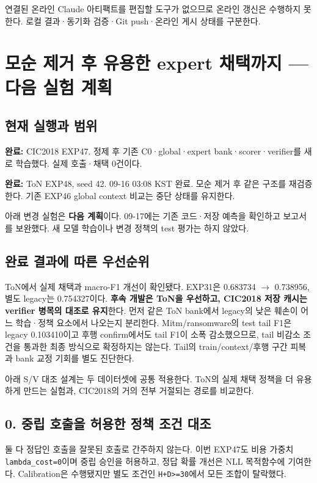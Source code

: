 연결된 온라인 Claude 아티팩트를 편집할 도구가 없으므로 온라인 갱신은 수행하지 못한다. 로컬 결과·동기화 검증·Git push·온라인 게시 상태를 구분한다.



\section{모순 제거 후 유용한 expert 채택까지 — 다음 실험 계획}
\subsection{현재 실행과 범위}
\par\noindent \textbullet\enspace \textbf{완료:} CIC2018 EXP47. 정제 후 기존 C0·global·expert bank·scorer·verifier를 새로 학습했다. 실제 호출·채택 0건이다.


\par\noindent \textbullet\enspace \textbf{완료:} ToN EXP48, seed 42. 09-16 03:08 KST 완료. 모순 제거 후 같은 구조를 재검증한다. 기존 EXP46 global context 비교는 중단 상태를 유지한다.


\par\noindent \textbullet\enspace 아래 변경 실험은 \textbf{다음 계획}이다. 09-17에는 기존 코드·저장 예측을 확인하고 보고서를 보완했다. 새 모델 학습이나 변경 정책의 test 평가는 하지 않았다.


\subsection{완료 결과에 따른 우선순위}
ToN에서 실제 채택과 macro-F1 개선이 확인됐다. EXP31은 0.683734 \ensuremath{\rightarrow} 0.738956, 별도 legacy는 0.754327이다. \textbf{후속 개발은 ToN을 우선하고, CIC2018 저장 캐시는 verifier 병목의 대조로 유지}한다. 먼저 같은 ToN bank에서 legacy의 낮은 훼손이 어느 학습·정책 요소에서 나오는지 분리한다. Mitm/\allowbreak{}ransomware의 test tail F1은 legacy 0.103410이고 후행 confirm에서도 tail F1이 소폭 감소했으므로, tail 비감소 조건을 통과한 최종 방식으로 확정하지는 않는다. Tail의 train/\allowbreak{}context/\allowbreak{}후행 구간 피복과 bank 교정 기회를 별도 진단한다.

아래 S/\allowbreak{}V 대조 설계는 두 데이터셋에 공통 적용한다. ToN의 실제 채택 정책을 더 유용하게 만드는 실험과, CIC2018의 거의 전부 거절되는 경로를 비교한다.

\subsection{0. 중립 호출을 허용한 정책 조건 대조}
둘 다 정답인 호출을 잘못된 호출로 간주하지 않는다. 이번 EXP47도 비용 가중치 \texttt{lambda\_\allowbreak{}\allowbreak{}c\allowbreak{}ost=\allowbreak{}\allowbreak{}0}이며 중립 승인을 허용하고, 정답 확률 개선은 NLL 목적함수에 기여한다. Calibration은 수행됐지만 별도 조건인 \texttt{H+\allowbreak{}\allowbreak{}D>=\allowbreak{}\allowbreak{}30}에서 모든 조합이 탈락했다.

